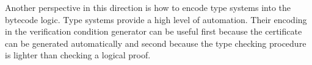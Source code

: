 
Another perspective in this direction is how   to encode type systems into the bytecode logic. 
Type systems provide a high level of automation. 
Their encoding in the verification condition generator can be useful first because the certificate can be generated automatically and
second because the type checking procedure is lighter than checking a logical proof.

